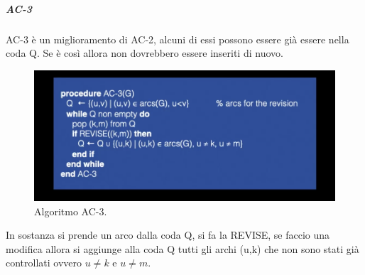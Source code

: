 \subparagraph{AC-3}
AC-3 è un miglioramento di AC-2, alcuni di essi possono essere già essere nella coda Q. Se è così allora non dovrebbero essere inseriti di nuovo. 
\begin{figure}[H]
    \centering
    \includegraphics[width=13cm, keepaspectratio]{img/ac3.png}
    \caption{Algoritmo AC-3.}\label{fig:ac3}
\end{figure}
In sostanza si prende un arco dalla coda Q, si fa la REVISE, se faccio una modifica allora si aggiunge alla coda Q tutti gli archi (u,k) che non sono stati già controllati ovvero $u \neq k$ e $u\neq m$.

